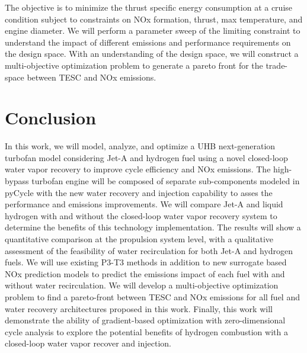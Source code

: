 \documentclass[conf]{new-aiaa}
\begin{document}
The objective is to minimize the thrust specific energy consumption at a cruise condition subject to constraints on NOx formation, thrust, max temperature, and engine diameter.
We will perform a parameter sweep of the limiting constraint to understand the impact of different emissions and performance requirements on the design space.
With an understanding of the design space, we will construct a multi-objective optimization problem to generate a pareto front for the trade-space between TESC and NOx emissions.

\section{Conclusion}
In this work, we will model, analyze, and optimize a UHB next-generation turbofan model considering Jet-A and hydrogen fuel using a novel closed-loop water vapor recovery to improve cycle efficiency and NOx emissions.
The high-bypass turbofan engine will be composed of separate sub-components modeled in pyCycle with the new water recovery and injection capability to asses the performance and emissions improvements.
We will compare Jet-A and liquid hydrogen with and without the closed-loop water vapor recovery system to determine the benefits of this technology implementation.
The results will show a quantitative comparison at the propulsion system level, with a qualitative assessment of the feasibility of water recirculation for both Jet-A and hydrogen fuels.
We will use existing P3-T3 methods in addition to new surrogate based NOx prediction models to predict the emissions impact of each fuel with and without water recirculation.
We will develop a multi-objective optimization problem to find a pareto-front between TESC and NOx emissions for all fuel and water recovery architectures proposed in this work.
Finally, this work will demonstrate the ability of gradient-based optimization with zero-dimensional cycle analysis to explore the potential benefits of hydrogen combustion with a closed-loop water vapor recover and injection.


\end{document}
